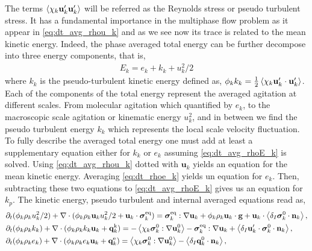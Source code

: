 The terms $\left<\chi_k \textbf{u}_k'\textbf{u}_k'\right>$ will be referred as the Reynolds stress or pseudo turbulent stress. 
It has a fundamental importance in the multiphase flow problem as it appear in \ref{eq:dt_avg_rhou_k} and as we see now its trace is related to the mean kinetic energy. 
Indeed, the phase averaged total energy can be further decompose into three energy components, that is,  
\begin{align}
    E_k = e_k + k_k + u_k^2/2
    \label{eq:E_def2}
\end{align}
where $k_k$ is the pseudo-turbulent kinetic energy defined as, $\phi_k k_k = \frac{1}{2}\left<\chi_k \textbf{u}_k'\cdot \textbf{u}_k'\right>$. 
Each of the components of the total energy represent the averaged agitation at different scales. 
From molecular agitation which quantified by $e_k$, to the macroscopic scale agitation or kinematic energy $u_k^2$, and in between we find the pseudo turbulent energy $k_k$ which represents the local scale velocity fluctuation. 
To fully describe the averaged total energy one must add at least a supplementary equation either for $k_k$ or $e_k$ assuming \ref{eq:dt_avg_rhoE_k} is solved. 
Using \ref{eq:dt_avg_rhou_k} dotted with $\textbf{u}_k$ yields an equation for the mean kinetic energy. 
Averaging \ref{eq:dt_rhoe_k} yields un equation for $e_k$.  
Then, subtracting these two equations to \ref{eq:dt_avg_rhoE_k} gives us an equation for $k_p$. 
The kinetic energy, pseudo turbulent and internal averaged equations read as, 
\begin{align}
    \label{eq:dt_avg_uk2}
    &\partial_t (\phi_k \rho_ku_k^2/2)  
    + \mathbf{\nabla}\cdot (
        \phi_k \rho_k\textbf{u}_ku_k^2/2
        + \textbf{u}_k \cdot \bm{\sigma}_k^\text{eq}
    )
    = 
    \bm{\sigma}_k^\text{eq} : \mathbf{\nabla} \textbf{u}_k
    + \phi_k \rho_k \textbf{u}_k\cdot \textbf{g} 
    +  \textbf{u}_k\cdot \left<\delta_I \bm{\sigma}_k^0 \cdot \textbf{n}_k\right>,\\
    \label{eq:dt_avg_kk}
    &\partial_t (\phi_k\rho_kk_k)  
    + \mathbf{\nabla}\cdot (
        \phi_k\rho_kk_k\textbf{u}_k
        + \textbf{q}_k^\text{k} 
        )
    = 
    - \left<\chi_k\bm{\sigma}_k^0 : \mathbf{\nabla} \textbf{u}_k^0\right>
    - \bm{\sigma}_k^\text{eq} : \mathbf{\nabla} \textbf{u}_k
    + \left<\delta_I \textbf{u}_k' \cdot \bm{\sigma}_k^0 \cdot \textbf{n}_k\right>,\\
    \label{eq:dt_avg_ek}
    &\partial_t (\phi_k\rho_ke_k)  
    + \mathbf{\nabla}\cdot (
        \phi_k \rho_ke_k\textbf{u}_k
        +
        \textbf{q}_k^\text{e} 
        )
    = 
    \left<\chi_k\bm{\sigma}_k^0 : \mathbf{\nabla} \textbf{u}_k^0\right>
    - \left<\delta_I \textbf{q}_k^0 \cdot \textbf{n}_k\right>,
\end{align}
